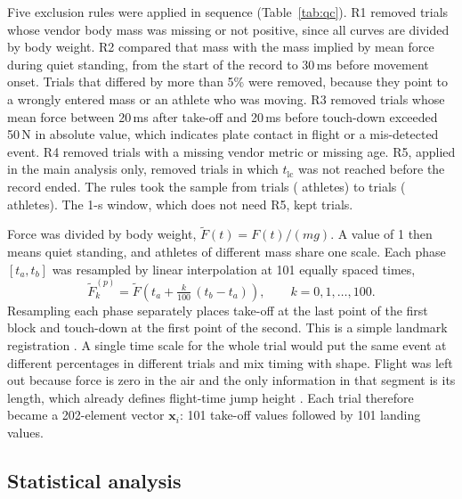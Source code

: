 Five exclusion rules were applied in sequence (Table~\ref{tab:qc}). R1 removed trials whose vendor body mass was missing or not positive, since all curves are divided by body weight. R2 compared that mass with the mass implied by mean force during quiet standing, from the start of the record to 30\,ms before movement onset. Trials that differed by more than 5\% were removed, because they point to a wrongly entered mass or an athlete who was moving. R3 removed trials whose mean force between 20\,ms after take-off and 20\,ms before touch-down exceeded 50\,N in absolute value, which indicates plate contact in flight or a mis-detected event. R4 removed trials with a missing vendor metric or missing age. R5, applied in the main analysis only, removed trials in which $t_{\mathrm{lc}}$ was not reached before the record ended. The rules took the sample from \nTrialsAll{} trials (\nAthAll{} athletes) to \nTrials{} trials (\nAth{} athletes). The 1-s window, which does not need R5, kept \nTrialsS{} trials.



Force was divided by body weight, $\tilde F(t) = F(t)/(m g)$. A value of 1 then means quiet standing, and athletes of different mass share one scale. Each phase $[t_a, t_b]$ was resampled by linear interpolation at 101 equally spaced times,
\begin{equation}
\tilde F^{(p)}_k = \tilde F\!\left(t_a + \tfrac{k}{100}\,(t_b - t_a)\right), \qquad k = 0, 1, \ldots, 100.
\end{equation}
Resampling each phase separately places take-off at the last point of the first block and touch-down at the first point of the second. This is a simple landmark registration \parencite{ramsay2005,richter2014a,moudy2018}. A single time scale for the whole trial would put the same event at different percentages in different trials and mix timing with shape. Flight was left out because force is zero in the air and the only information in that segment is its length, which already defines flight-time jump height \parencite{linthorne2001}. Each trial therefore became a 202-element vector $\mathbf{x}_i$: 101 take-off values followed by 101 landing values.

\subsection{Statistical analysis}


